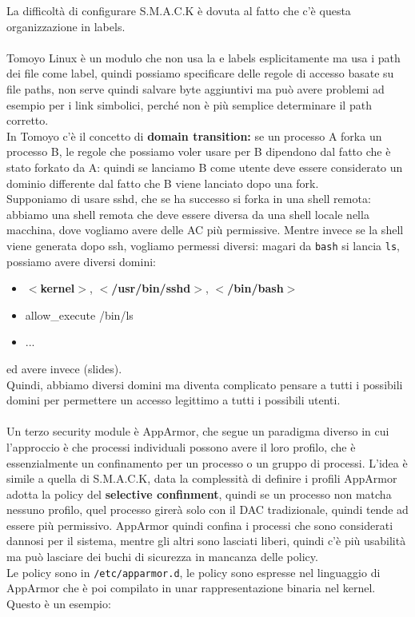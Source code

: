 \documentclass[12pt, oneside]{extbook} %
\begin{document}
La difficoltà di configurare S.M.A.C.K è dovuta al fatto che c'è questa organizzazione in labels.\\\\Tomoyo Linux è un modulo che non usa la e labels esplicitamente ma usa i path dei file come label, quindi possiamo specificare delle regole di accesso basate su file paths, non serve quindi salvare byte aggiuntivi  ma può avere problemi ad esempio per i link simbolici, perché non è più semplice determinare il path corretto.\\In Tomoyo c'è il concetto di \textbf{domain transition:} se un processo A forka un processo B, le regole che possiamo voler usare per B dipendono dal fatto che è stato forkato da A: quindi se lanciamo B come utente deve essere considerato un dominio differente dal fatto che B viene lanciato dopo una fork.\\ Supponiamo di usare sshd, che se ha successo si forka in una shell remota: abbiamo una shell remota che deve essere diversa da una shell locale nella macchina, dove vogliamo avere delle AC più permissive. Mentre invece se la shell viene generata dopo ssh, vogliamo permessi diversi: magari da \texttt{bash} si lancia \texttt{ls}, possiamo avere diversi domini:
\begin{itemize}
\item \textbf{$<$kernel$>$}, \textbf{$<$/usr/bin/sshd$>$}, \textbf{$<$/bin/bash$>$}
\item allow\_execute /bin/ls
\item ...
\end{itemize}
ed avere invece (slides).\\Quindi, abbiamo diversi domini ma diventa complicato pensare a tutti i possibili domini per permettere un accesso legittimo a tutti i possibili utenti.\\\\Un terzo security module è AppArmor, che segue un paradigma diverso in cui l'approccio è che processi individuali possono avere il loro profilo, che è essenzialmente un confinamento per un processo o un gruppo di processi. L'idea è simile a quella di S.M.A.C.K, data la complessità di definire i profili AppArmor adotta la policy del \textbf{selective confinment}, quindi se un processo non matcha nessuno profilo, quel processo girerà solo con il DAC tradizionale, quindi tende ad essere più permissivo. AppArmor quindi confina i processi che sono considerati dannosi per il sistema, mentre gli altri sono lasciati liberi, quindi c'è più usabilità ma può lasciare dei buchi di sicurezza in mancanza delle policy.\\Le policy sono in \texttt{/etc/apparmor.d}, le policy sono espresse nel linguaggio di AppArmor che è poi compilato in unar rappresentazione binaria nel kernel. Questo è un esempio:
\end{document}

